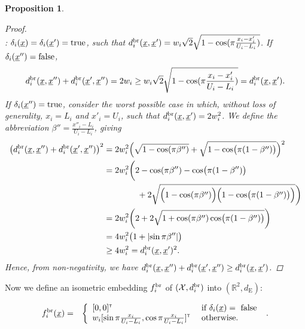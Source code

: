 \documentclass[letterpaper]{article}
\newcommand{\vect}[1]{\underline{\smash{#1}}}
\renewcommand{\v}[1]{\vect{#1}}
\newcommand{\reals}{\mathds{R}}
\newcommand{\sX}{\mathcal{X}}
\newcommand{\br}{^{\text{\textnormal{br}}}}
\newcommand\transpose{{\textrm{\tiny{\sf{T}}}}}
\newtheorem{prop}[thm]{Proposition}
\begin{document}
\begin{prop}
\begin{proof}
~\\: $\delta_i(\v{x}) = \delta_i(\v{x}')=\textrm{true}$, such that  $d\br_i(\v{x},\v{x}') = w_i \sqrt{2} \sqrt{1 - \cos(\pi \frac{x_i-x_i'}{U_i-L_i})}$.  If  $\delta_i(\v{x}'') = \text{false}$,
\begin{align}
d\br_i(\v{x},\v{x}'') + d\br_i(\v{x}',\v{x}'') = 2 w_i \geq w_i \sqrt{2} \sqrt{1 - \cos(\pi \frac{x_i-x_i'}{U_i-L_i})} = d\br_i(\v{x},\v{x}').
\end{align} 
If  $\delta_i(\v{x}'') = \text{true}$, consider the worst possible case in which, without loss of generality, $x_i=L_i$ and $x'_i=U_i$, such that $d\br_i(\v{x},\v{x}')=2 w_i^2$.  We define the abbreviation $\beta'' = \frac{x''_i-L_i}{U_i-L_i}$, giving
\begin{align}
\bigl(d\br_i(\v{x},\v{x}'') + d\br_i(\v{x}',\v{x}'')\bigr)^2
& = 2w_i^2 \Bigl(\sqrt{1 - \cos (\pi \beta'')} + \sqrt{1 - \cos \bigl(\pi (1-\beta'')\bigr)}\Bigr)^2\nonumber\\
&=2w_i^2\biggl(2 - \cos (\pi \beta'') - \cos \bigl(\pi (1-\beta'')\bigr)
\nonumber\\
&\qquad\qquad+2\sqrt{\Bigl(1 - \cos (\pi \beta'')\Bigr)\Bigl(1 - \cos \bigl(\pi (1-\beta'')\bigr)\Bigr)}\biggr)\nonumber\\
&=2w_i^2\biggl(2 +2\sqrt{1 + \cos (\pi \beta'')\cos \bigl(\pi (1-\beta'')\bigr)}\biggr)\nonumber\\
&=4 w_i^2 \bigl(1 + \left|\sin \pi \beta'' \right|\bigr)\nonumber\\
&\geq 4 w_i^2 = d\br_i(\v{x},\v{x}')^2.
\end{align}
Hence, from non-negativity, we have $d\br_i(\v{x},\v{x}'') + d\br_i(\v{x}',\v{x}'')\geq d\br_i(\v{x},\v{x}')$.
\end{proof}
\end{prop}

Now we define an isometric embedding $f_i\br$ of $(\sX, d\br_i)$ into $(\reals^{2},d_{\text{E}})$:

\begin{eqnarray}
\nonumber{}f_i\br(\v{x}) & = & \left\{\begin{array}{ll}
[0,0]^\transpose & \textrm{ if } \delta_i(\v{x}) = \textrm{ false }\\
\nonumber{} w_i [\sin{\pi\frac{x_i}{U_i-L_i}}, \cos{\pi\frac{x_i}{U_i-L_i}}]^\transpose & \textrm{ otherwise.}\end{array}\right..
\end{eqnarray}
\end{document}

